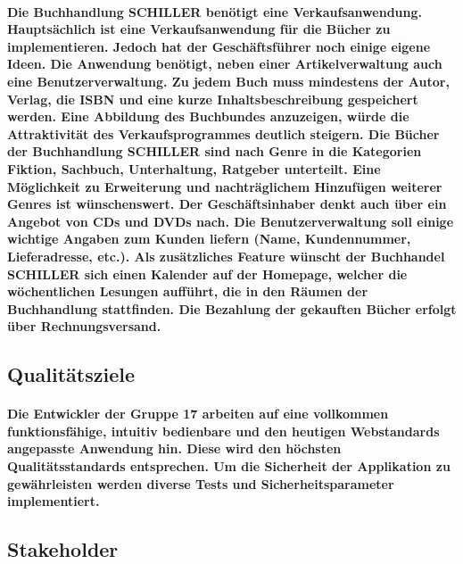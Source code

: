 \documentclass[a4paper]{article}
\begin{document}
\paragraph{Die Buchhandlung SCHILLER benötigt eine Verkaufsanwendung. Hauptsächlich ist eine Verkaufsanwendung für die Bücher zu implementieren. Jedoch hat der Geschäftsführer noch einige eigene Ideen. 
Die Anwendung benötigt, neben einer Artikelverwaltung auch eine Benutzerverwaltung. Zu jedem Buch muss mindestens der Autor, Verlag, die ISBN und eine kurze Inhaltsbeschreibung gespeichert werden. Eine Abbildung des Buchbundes anzuzeigen, würde die Attraktivität des Verkaufsprogrammes deutlich steigern. Die Bücher der Buchhandlung SCHILLER sind nach Genre in die Kategorien Fiktion, Sachbuch, Unterhaltung, Ratgeber unterteilt. Eine Möglichkeit zu Erweiterung und nachträglichem Hinzufügen weiterer Genres ist wünschenswert. Der Geschäftsinhaber denkt auch über ein Angebot von CDs und DVDs nach. Die Benutzerverwaltung soll einige wichtige Angaben zum Kunden liefern (Name, Kundennummer, Lieferadresse, etc.). 
Als zusätzliches Feature wünscht der Buchhandel SCHILLER sich einen Kalender auf der Homepage, welcher die wöchentlichen Lesungen aufführt, die in den Räumen der Buchhandlung stattfinden. Die Bezahlung der gekauften Bücher erfolgt über Rechnungsversand.}

\subsection{Qualitätsziele}

\paragraph{Die Entwickler der Gruppe 17 arbeiten auf eine vollkommen funktionsfähige, intuitiv bedienbare und den heutigen Webstandards angepasste Anwendung hin. Diese wird den höchsten Qualitätsstandards entsprechen. Um die Sicherheit der Applikation zu gewährleisten werden diverse Tests und Sicherheitsparameter implementiert.}

\subsection{Stakeholder}
\end{document}
